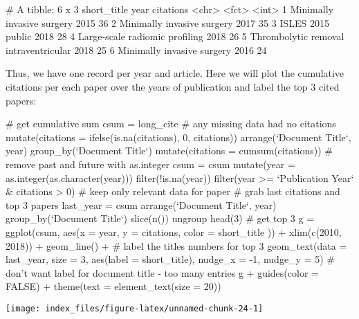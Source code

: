 \begin{Schunk}
\begin{Soutput}
# A tibble: 6 x 3
  short_title                           year  citations
  <chr>                                 <fct>     <int>
1 Minimally invasive surgery            2015         36
2 Minimally invasive surgery            2017         35
3 ISLES 2015 public                     2018         28
4 Large-scale radiomic profiling        2018         26
5 Thrombolytic removal intraventricular 2018         25
6 Minimally invasive surgery            2016         24
\end{Soutput}
\end{Schunk}

Thus, we have one record per year and article. Here we will plot the
cumulative citations per each paper over the years of publication and
label the top 3 cited papers:

\begin{Schunk}
\begin{Sinput}
# get cumulative sum
csum = long_cite %>% 
  # any missing data had no citations
  mutate(citations = ifelse(is.na(citations), 0, citations)) %>% 
  arrange(`Document Title`, year) %>% # sort for cumsum
  group_by(`Document Title`) %>% 
  mutate(citations = cumsum(citations))
# remove past and future with as.integer
csum = csum %>% 
  mutate(year = as.integer(as.character(year))) %>% 
  filter(!is.na(year)) %>% # remove < 2008 and > 2018 years
  filter(year >= `Publication Year` & citations > 0) # keep only relevant data for paper
# grab last citations and top 3 papers
last_year = csum %>% 
  arrange(`Document Title`, year) %>% # sort for slice later
  group_by(`Document Title`) %>% 
  slice(n()) %>% # keep last as max citations
  ungroup %>% arrange(-citations) %>% 
  head(3)  # get top 3
g = ggplot(csum, 
           aes(x = year, y = citations, color = short_title  )) +
  xlim(c(2010, 2018)) + geom_line() + 
  # label the titles numbers for top 3
  geom_text(data = last_year, size = 3, aes(label = short_title), 
            nudge_x = -1, nudge_y = 5)
# don't want label for document title - too many entries
g + guides(color = FALSE) + theme(text = element_text(size = 20))
\end{Sinput}

\texttt{[image: index\_files/figure-latex/unnamed-chunk-24-1]} \end{Schunk}


